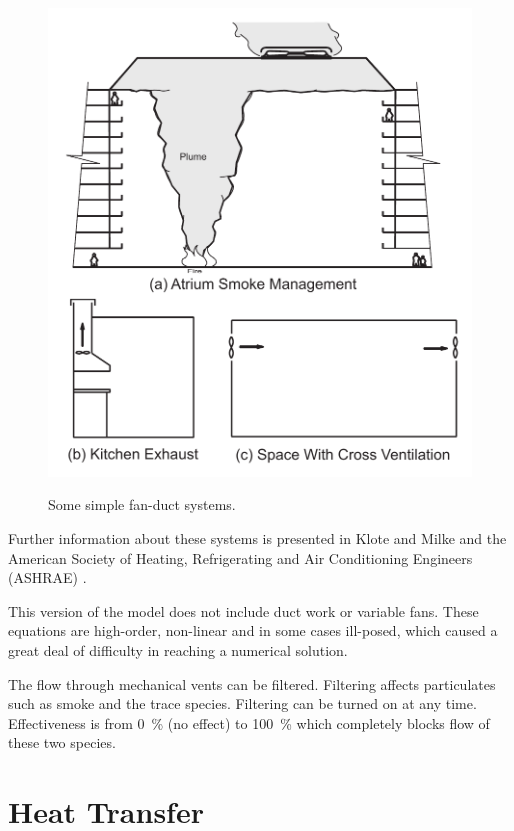 \begin{figure}
\begin{center}
\includegraphics[width=5.0in]{FIGURES/Theory/HVAC_Fans_and_Ducts}\\
\end{center}
\caption{Some simple fan-duct systems.}
 \label{fig:Fans_and_Ducts}
\end{figure}

Further information about these systems is presented in Klote and Milke \cite{Klote:2002} and the American Society of Heating, Refrigerating and Air Conditioning Engineers (ASHRAE) \cite{ASHRAE:2001}.

This version of the model does not include duct work or variable fans. These equations are high-order, non-linear and in some cases ill-posed, which caused a great deal of difficulty in reaching a numerical solution.

The flow through mechanical vents can be filtered. Filtering affects particulates such as smoke and the trace species. Filtering can be turned on at any time. Effectiveness is from 0~\% (no effect) to 100~\% which completely blocks flow of these two species.





\chapter{Heat Transfer}

